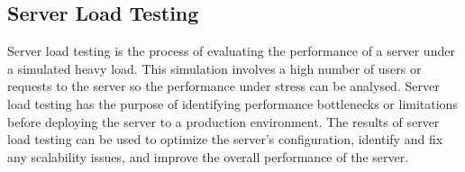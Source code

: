 \documentclass{article}
\begin{document}
        \subsection{Server Load Testing}

            Server load testing is the process of evaluating the performance of a server under a simulated heavy load.
            This simulation involves a high number of users or requests to the server so the performance under stress can be analysed.
            Server load testing has the purpose of identifying performance bottlenecks or limitations before deploying the server to a production environment.
            The results of server load testing can be used to optimize the server's configuration, identify and fix any scalability issues, and improve the overall performance of the server.

    
    
\end{document}

